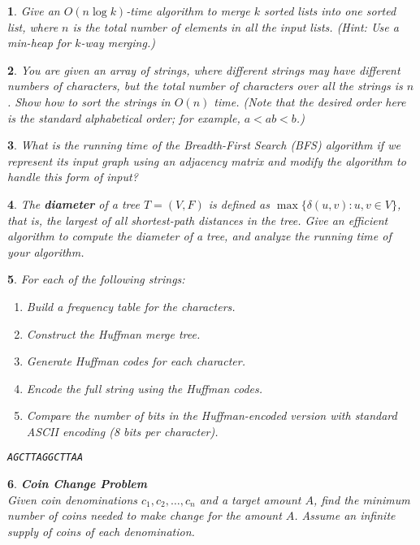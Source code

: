 \documentclass[%
addpoints]{exam}
\theoremstyle{problem}
\newtheorem{p}{}
\begin{document}
\begin{p}
Give an \( O(n \log k) \)-time algorithm to merge \( k \) sorted lists into one sorted list,  
where \( n \) is the total number of elements in all the input lists. (Hint: Use a min-heap for \( k \)-way merging.)
\hfill \end{p}

\begin{p}
You are given an array of strings, where different strings may have different  
numbers of characters, but the total number of characters over all the strings  
is \( n \). Show how to sort the strings in \( O(n) \) time.  
(Note that the desired order here is the standard alphabetical order; for example,  
\( a < ab < b \).)
\hfill \end{p}

\begin{p}
What is the running time of the Breadth-First Search (BFS) algorithm if we represent its input graph using an adjacency matrix and modify the algorithm to handle this form of input?
\hfill \end{p}

\begin{p}
The \textbf{diameter} of a tree \( T = (V, F) \) is defined as \( \max \{ \delta(u, v) : u, v \in V \} \), that is, the largest of all shortest-path distances in the tree. Give an efficient algorithm to compute the diameter of a tree, and analyze the running time of your algorithm.
\hfill \end{p}

\begin{p}
For each of the following strings:
\begin{enumerate}[label=\alph*.]
    \item Build a frequency table for the characters.
    \item Construct the Huffman merge tree.
    \item Generate Huffman codes for each character.
    \item Encode the full string using the Huffman codes.
    \item Compare the number of bits in the Huffman-encoded version with standard ASCII encoding (8 bits per character).
\end{enumerate}

\texttt{AGCTTAGGCTTAA}
\hfill \end{p}

\begin{p}
\textbf{Coin Change Problem} \\[1ex]
Given coin denominations $c_1, c_2, \ldots, c_n$ and a target amount $A$, find the minimum number of coins needed to make change for the amount $A$. Assume an infinite supply of coins of each denomination.
\hfill \end{p}
\end{document}
